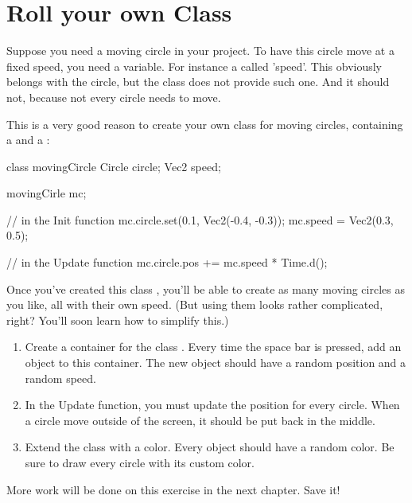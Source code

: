 \section{Roll your own Class}
Suppose you need a moving circle in your project. To have this circle move at a fixed speed, you need a variable. For instance a  called 'speed'. This  obviously belongs with the circle, but the class  does not provide such one. And it should not, because not every circle needs to move. 

This is a very good reason to create your own class for moving circles, containing a  and a :

\begin{code}
class movingCircle {
  Circle circle;
  Vec2 speed;
}

movingCirle mc;

// in the Init function
mc.circle.set(0.1, Vec2(-0.4, -0.3));
mc.speed = Vec2(0.3, 0.5);

// in the Update function
mc.circle.pos += mc.speed * Time.d();
\end{code}

Once you've created this class , you'll be able to create as many moving circles as you like, all with their own speed. (But using them looks rather complicated, right? You'll soon learn how to simplify this.)

\begin{exercise}
\begin{enumerate}
  \item Create a container for the class . Every time the space bar is pressed, add an object to this container. The new object should have a random position and a random speed.
	\item In the Update function, you must update the position for every circle. When a circle move outside of the screen, it should be put back in the middle.
	\item Extend the class  with a color. Every object should have a random color. Be sure to draw every circle with its custom color.
	\end{enumerate}
\end{exercise}

\begin{note}
More work will be done on this exercise in the next chapter. Save it!
\end{note}
